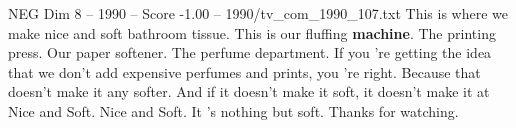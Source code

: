 \begin{textsample}{NEG Dim 8 – 1990 – Score -1.00 – 1990/tv\_com\_1990\_107.txt}  \label{ex:f8_neg_023}
This is where we make nice and soft bathroom tissue.
This is our fluffing \textbf{machine}.
The printing press.
Our paper softener.
The perfume department.
If you 're getting the idea that we don't add expensive perfumes and prints, you 're right.
Because that doesn't make it any softer.
And if it doesn't make it soft, it doesn't make it at Nice and Soft.
Nice and Soft.
It 's nothing but soft.
Thanks for watching.

\end{textsample}
